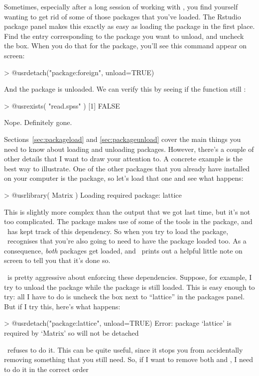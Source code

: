 

Sometimes, especially after a long session of working with \R, you find yourself wanting to get rid of some of those packages that you've loaded. The Rstudio package panel makes this exactly as easy as loading the package in the first place. Find the entry corresponding to the package you want to unload, and uncheck the box. When you do that for the  package, you'll see this command appear on screen:
\begin{rblock1}
> @usr{detach("package:foreign", unload=TRUE)}
\end{rblock1}
And the package is unloaded. We can verify this by seeing if the  function still : 
\begin{rblock1}
> @usr{exists( "read.spss" )}
[1] FALSE 
\end{rblock1}
Nope. Definitely gone. 




Sections~\ref{sec:packageload} and \ref{sec:packageunload} cover the main things you need to know about loading and unloading packages. However, there's a couple of other details that I want to draw your attention to. A concrete example is the best way to illustrate. One of the other packages that you already have installed on your computer is the  package, so let's load that one and see what happens:
\begin{rblock1}
> @usr{library( Matrix )}
Loading required package: lattice
\end{rblock1}
This is slightly more complex than the output that we got last time, but it's not too complicated. The  package makes use of some of the tools in the  package, and \R\ has kept track of this dependency. So when you try to load the  package, \R\ recognises that you're also going to need to have the  package loaded too. As a consequence, {\it both} packages get loaded, and \R\ prints out a helpful little note on screen to tell you that it's done so. 

\R\ is pretty aggressive about enforcing these dependencies. Suppose, for example, I try to unload the  package while the  package is still loaded. This is easy enough to try: all I have to do is uncheck the box next to ``lattice'' in the packages panel. But if I try this, here's what happens:
\begin{rblock1}
> @usr{detach("package:lattice", unload=TRUE)}
Error: package `lattice' is required by `Matrix' so will not be detached
\end{rblock1}
\R\ refuses to do it. This can be quite useful, since it stops you from accidentally removing something that you still need. So, if I want to remove both  and , I need to do it in the correct order



